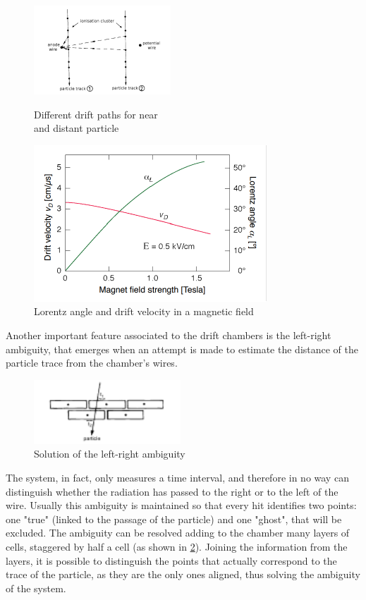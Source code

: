 \documentclass[a4paper,11pt]{book}
\begin{document}
\begin{figure}[hbtp]
\begin{minipage}[c]{0.5\textwidth}
\centering
\includegraphics[scale = 2]{pictures/drift_ch_diff_paths.pdf}
\caption{Different drift paths for near\\ and distant particle}
\label{fig:drift_ch_diff_path}
\end{minipage}  
\begin{minipage}[c]{0.5\textwidth}
\centering
\includegraphics[scale=1]{pictures/lorentz_angle.pdf}
\caption{Lorentz angle and drift velocity in a magnetic field}
\label{fig:lorentz_angle}
\end{minipage}
\end{figure}

Another important feature associated to the drift chambers is the left-right ambiguity, that emerges when an attempt is made to estimate the distance of the particle trace from the chamber's wires.

\begin{figure}
\centering
\includegraphics[width=5.5cm]{pictures/drift_ch_left_right.pdf}
\caption{Solution of the left-right ambiguity}
\label{fig:left_right_ambiguity}
\end{figure} 

The system, in fact, only measures a time interval, and therefore in no way can distinguish whether the radiation has passed to the right or to the left of the wire. Usually this ambiguity is maintained so that every hit identifies two points: one "true" (linked to the passage of the particle) and one "ghost", that will be excluded. The ambiguity can be resolved adding to the chamber many layers of cells, staggered by half a cell (as shown in \ref{fig:left_right_ambiguity}). Joining the information from the layers, it is possible to distinguish the points that actually correspond to the trace of the particle, as they are the only ones aligned, thus solving the ambiguity of the system.\\
\end{document}
